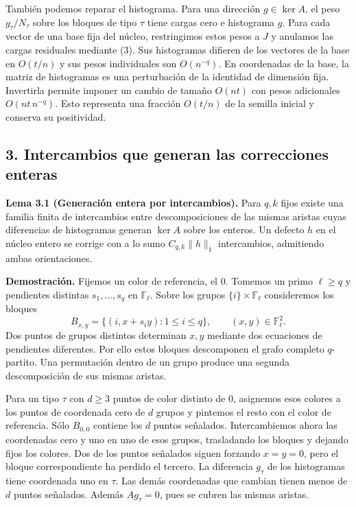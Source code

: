 \documentclass[spanish,11pt,a4paper]{article}
\begin{document}
También podemos reparar el histograma. Para una dirección \(g\in\ker A\), el peso \(g_\tau/N_\tau\) sobre los bloques de tipo \(\tau\) tiene cargas cero e histograma \(g\). Para cada vector de una base fija del núcleo, restringimos estos pesos a \(J\) y anulamos las cargas residuales mediante (3). Sus histogramas difieren de los vectores de la base en \(O(t/n)\) y sus pesos individuales son \(O(n^{-q})\). En coordenadas de la base, la matriz de histogramas es una perturbación de la identidad de dimensión fija. Invertirla permite imponer un cambio de tamaño \(O(nt)\) con pesos adicionales \(O(nt\,n^{-q})\). Esto representa una fracción \(O(t/n)\) de la semilla inicial y conserva su positividad.

\subsection{3. Intercambios que generan las correcciones enteras}\label{intercambios-que-generan-las-correcciones-enteras}

\textbf{Lema 3.1 (Generación entera por intercambios).} Para \(q,k\) fijos existe una familia finita de intercambios entre descomposiciones de las mismas aristas cuyas diferencias de histogramas generan \(\ker A\) sobre los enteros. Un defecto \(h\) en el núcleo entero se corrige con a lo sumo \(C_{q,k}\|h\|_1\) intercambios, admitiendo ambas orientaciones.

\textbf{Demostración.} Fijemos un color de referencia, el \(0\). Tomemos un primo \(\ell\ge q\) y pendientes distintas \(s_1,\ldots,s_q\) en \(\mathbb F_\ell\). Sobre los grupos \(\{i\}\times\mathbb F_\ell\) consideremos los bloques \[B_{x,y}=\{(i,x+s_i y):1\le i\le q\},\qquad (x,y)\in\mathbb F_\ell^2 .\] Dos puntos de grupos distintos determinan \(x,y\) mediante dos ecuaciones de pendientes diferentes. Por ello estos bloques descomponen el grafo completo \(q\)-partito. Una permutación dentro de un grupo produce una segunda descomposición de sus mismas aristas.

Para un tipo \(\tau\) con \(d\ge3\) puntos de color distinto de \(0\), asignemos esos colores a los puntos de coordenada cero de \(d\) grupos y pintemos el resto con el color de referencia. Sólo \(B_{0,0}\) contiene los \(d\) puntos señalados. Intercambiemos ahora las coordenadas cero y uno en uno de esos grupos, trasladando los bloques y dejando fijos los colores. Dos de los puntos señalados siguen forzando \(x=y=0\), pero el bloque correspondiente ha perdido el tercero. La diferencia \(g_\tau\) de los histogramas tiene coordenada uno en \(\tau\). Las demás coordenadas que cambian tienen menos de \(d\) puntos señalados. Además \(Ag_\tau=0\), pues se cubren las mismas aristas.
\end{document}
